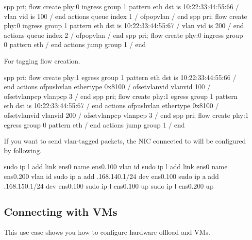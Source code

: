 \documentclass[a4paper,11pt,openany,oneside,english]{sphinxmanual}
\begin{document}
\begin{sphinxVerbatim}[commandchars=\\\{\},formatcom=\footnotesize]
spp \PYGZgt{} pri; flow create phy:0 ingress group 1 pattern eth dst is \PYGZbs{}
10:22:33:44:55:66 / vlan vid is 100 / end actions queue index 1 \PYGZbs{}
/ of\PYGZus{}pop\PYGZus{}vlan / end
spp \PYGZgt{} pri; flow create phy:0 ingress group 1 pattern eth dst is \PYGZbs{}
10:22:33:44:55:67 / vlan vid is 200 / end actions queue index 2 \PYGZbs{}
/ of\PYGZus{}pop\PYGZus{}vlan / end
spp \PYGZgt{} pri; flow create phy:0 ingress group 0 pattern eth / end \PYGZbs{}
actions jump group 1 / end
\end{sphinxVerbatim}

For tagging flow creation.

\begin{sphinxVerbatim}[commandchars=\\\{\},formatcom=\footnotesize]
spp \PYGZgt{} pri; flow create phy:1 egress group 1 pattern eth dst is \PYGZbs{}
10:22:33:44:55:66 / end actions of\PYGZus{}push\PYGZus{}vlan ethertype 0x8100 \PYGZbs{}
/ of\PYGZus{}set\PYGZus{}vlan\PYGZus{}vid vlan\PYGZus{}vid 100 / of\PYGZus{}set\PYGZus{}vlan\PYGZus{}pcp vlan\PYGZus{}pcp 3 / end
spp \PYGZgt{} pri; flow create phy:1 egress group 1 pattern eth dst is \PYGZbs{}
10:22:33:44:55:67 / end actions of\PYGZus{}push\PYGZus{}vlan ethertype 0x8100 \PYGZbs{}
/ of\PYGZus{}set\PYGZus{}vlan\PYGZus{}vid vlan\PYGZus{}vid 200 / of\PYGZus{}set\PYGZus{}vlan\PYGZus{}pcp vlan\PYGZus{}pcp 3 / end
spp \PYGZgt{} pri; flow create phy:1 egress group 0 pattern eth / end \PYGZbs{}
actions jump group 1 / end
\end{sphinxVerbatim}

If you want to send vlan-tagged packets, the NIC connected to 
will be configured by following.

\begin{sphinxVerbatim}[commandchars=\\\{\},formatcom=\footnotesize]
\PYGZdl{} sudo ip l add link ens0 name ens0.100  vlan id 
\PYGZdl{} sudo ip l add link ens0 name ens0.200  vlan id 
\PYGZdl{} sudo ip a add .168.140.1/24 dev ens0.100
\PYGZdl{} sudo ip a add .168.150.1/24 dev ens0.100
\PYGZdl{} sudo ip l  ens0.100 up
\PYGZdl{} sudo ip l  ens0.200 up
\end{sphinxVerbatim}


\subsection{Connecting with VMs}
\label{\detokenize{usecases/hardware-offload:connecting-with-vms}}
This use case shows you how to configure hardware offload and VMs.
\end{document}
